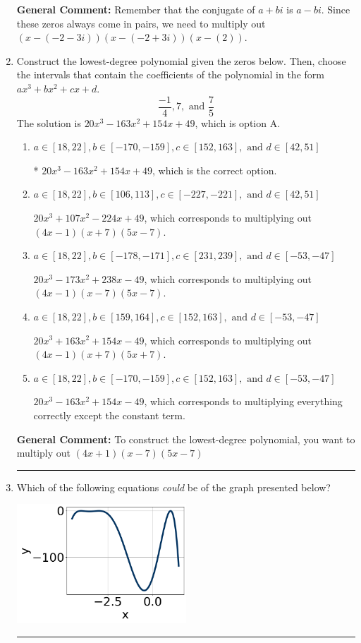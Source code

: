 \documentclass{extbook}[14pt]
\newcommand{\litem}[1]{\item #1

\rule{\textwidth}{0.4pt}}
\begin{document}
\begin{enumerate}
{\textbf{General Comment:} Remember that the conjugate of $a+bi$ is $a-bi$. Since these zeros always come in pairs, we need to multiply out $(x-(-2 - 3 i))(x-(-2 + 3 i))(x-(2))$.
}
\litem{
Construct the lowest-degree polynomial given the zeros below. Then, choose the intervals that contain the coefficients of the polynomial in the form $ax^3+bx^2+cx+d$.
\[ \frac{-1}{4}, 7, \text{ and } \frac{7}{5} \]The solution is \( 20x^{3} -163 x^{2} +154 x + 49 \), which is option A.\begin{enumerate}[label=\Alph*.]
\item \( a \in [18, 22], b \in [-170, -159], c \in [152, 163], \text{ and } d \in [42, 51] \)

* $20x^{3} -163 x^{2} +154 x + 49$, which is the correct option.
\item \( a \in [18, 22], b \in [106, 113], c \in [-227, -221], \text{ and } d \in [42, 51] \)

$20x^{3} +107 x^{2} -224 x + 49$, which corresponds to multiplying out $(4x -1)(x + 7)(5x -7)$.
\item \( a \in [18, 22], b \in [-178, -171], c \in [231, 239], \text{ and } d \in [-53, -47] \)

$20x^{3} -173 x^{2} +238 x -49$, which corresponds to multiplying out $(4x -1)(x -7)(5x -7)$.
\item \( a \in [18, 22], b \in [159, 164], c \in [152, 163], \text{ and } d \in [-53, -47] \)

$20x^{3} +163 x^{2} +154 x -49$, which corresponds to multiplying out $(4x -1)(x + 7)(5x + 7)$.
\item \( a \in [18, 22], b \in [-170, -159], c \in [152, 163], \text{ and } d \in [-53, -47] \)

$20x^{3} -163 x^{2} +154 x -49$, which corresponds to multiplying everything correctly except the constant term.
\end{enumerate}

\textbf{General Comment:} To construct the lowest-degree polynomial, you want to multiply out $(4x + 1)(x -7)(5x -7)$
}
\litem{
Which of the following equations \textit{could} be of the graph presented below?

\begin{center}
    \includegraphics[width=0.5\textwidth]{../Figures/polyGraphToFunctionA.png}
\end{center}


}
\end{enumerate}
\end{document}
